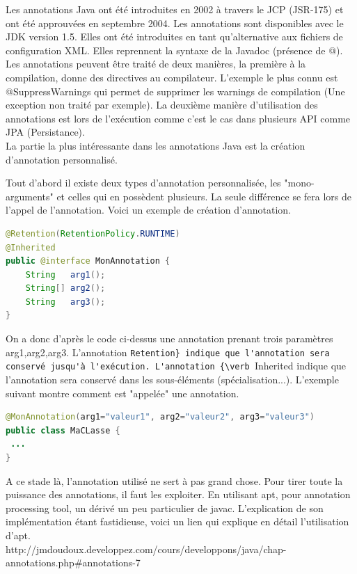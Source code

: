 \documentclass[a4paper,11pt]{report}
\begin{document}
{{\normalsize{
Les annotations Java ont été introduites en 2002 à travers le JCP (JSR-175) et ont été approuvées en septembre 2004. Les annotations sont disponibles avec le JDK version 1.5. Elles ont été introduites en tant qu'alternative aux fichiers de configuration XML. Elles reprennent la syntaxe de la Javadoc (présence de @).
Les annotations peuvent être traité de deux manières, la première à la compilation, donne des directives au compilateur. L'exemple le plus connu est @SuppressWarnings qui permet de supprimer les warnings de compilation (Une exception non traité par exemple). La deuxième manière d'utilisation des annotations est lors de l'exécution comme c'est le cas dans plusieurs API comme JPA (Persistance).\\
La partie la plus intéressante dans les annotations Java est la création d'annotation personnalisé. \\
}

\normalsize{
Tout d'abord il existe deux types d'annotation personnalisée, les "mono-arguments" et celles qui en possèdent plusieurs. La seule différence se fera lors de l'appel de l'annotation. Voici un exemple de création d'annotation. \\
}

\begin{lstlisting}[language=Java]
@Retention(RetentionPolicy.RUNTIME)
@Inherited
public @interface MonAnnotation {
    String   arg1();
    String[] arg2();
    String   arg3();
}
\end{lstlisting}

\normalsize{
On a donc d'après le code ci-dessus une annotation prenant trois paramètres arg1,arg2,arg3. L'annotation {\verb @Retention} indique que l'annotation sera conservé jusqu'à l'exécution. L'annotation {\verb @Inherited} indique que l'annotation sera conservé dans les sous-éléments (spécialisation...). L'exemple suivant montre comment est "appelée" une annotation. \\ 

\begin{lstlisting}[language=Java]
@MonAnnotation(arg1="valeur1", arg2="valeur2", arg3="valeur3")
public class MaCLasse {
 ...
}
\end{lstlisting}

\normalsize{
A ce stade là, l'annotation utilisé ne sert à pas grand chose. Pour tirer toute la puissance des annotations, il faut les exploiter. En utilisant apt, pour annotation processing tool, un dérivé un peu particulier de javac. L'explication de son implémentation étant fastidieuse, voici un lien qui explique en détail l'utilisation d'apt. \\
http://jmdoudoux.developpez.com/cours/developpons/java/chap-annotations.php\#annotations-7 \\


}}}}
\end{document}
